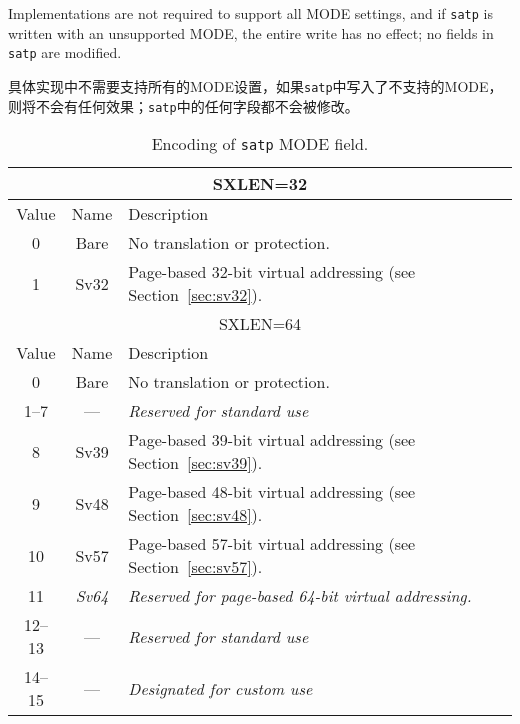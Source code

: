 Implementations are not required to support all MODE settings,
and if {\tt satp} is written with an unsupported MODE, the entire write has
no effect; no fields in {\tt satp} are modified.

具体实现中不需要支持所有的MODE设置，如果{\tt satp}中写入了不支持的MODE，
则将不会有任何效果；{\tt satp}中的任何字段都不会被修改。

\begin{table}[h]
\begin{center}
\begin{tabular}{|c|c|l|}
\hline
\multicolumn{3}{|c|}{SXLEN=32} \\
\hline
Value  & Name & Description \\
\hline
0       & Bare  & No translation or protection. \\
1       & Sv32  & Page-based 32-bit virtual addressing (see Section~\ref{sec:sv32}). \\
\hline \hline
\multicolumn{3}{|c|}{SXLEN=64} \\
\hline
Value  & Name & Description \\
\hline
0       & Bare  & No translation or protection. \\
1--7    & ---   & {\em Reserved for standard use} \\
8       & Sv39  & Page-based 39-bit virtual addressing (see Section~\ref{sec:sv39}). \\
9       & Sv48  & Page-based 48-bit virtual addressing (see Section~\ref{sec:sv48}). \\
10      & Sv57  & Page-based 57-bit virtual addressing (see Section~\ref{sec:sv57}). \\
11      & {\em Sv64} & {\em Reserved for page-based 64-bit virtual addressing.} \\
12--13  & ---   & {\em Reserved for standard use} \\
14--15  & ---   & {\em Designated for custom use} \\
\hline
\end{tabular}
\end{center}
\caption{Encoding of {\tt satp} MODE field.}
\label{tab:satp-mode}
\end{table}

